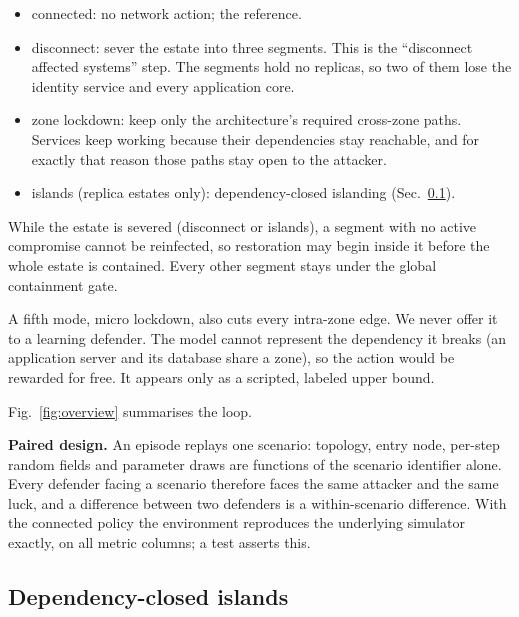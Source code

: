 \documentclass[conference,compsoc]{IEEEtran}
\begin{document}
\begin{itemize}
\item \textsf{connected}: no network action; the reference.
\item \textsf{disconnect}: sever the estate into three segments. This is the
``disconnect affected systems'' step. The segments hold no replicas, so
two of them lose the identity service and every application core.
\item \textsf{zone lockdown}: keep only the architecture's required
cross-zone paths. Services keep working because their dependencies stay
reachable, and for exactly that reason those paths stay open to the
attacker.
\item \textsf{islands} (replica estates only): dependency-closed islanding
(Sec.~\ref{sec:islands}).
\end{itemize}

While the estate is severed (\textsf{disconnect} or \textsf{islands}), a
segment with no active compromise cannot be reinfected, so restoration may
begin inside it before the whole estate is contained. Every other segment
stays under the global containment gate.

A fifth mode, \textsf{micro lockdown}, also cuts every intra-zone edge. We
never offer it to a learning defender. The model cannot represent the
dependency it breaks (an application server and its database share a
zone), so the action would be rewarded for free. It appears only as a
scripted, labeled upper bound.

Fig.~\ref{fig:overview} summarises the loop.

\textbf{Paired design.} An episode replays one scenario: topology, entry
node, per-step random fields and parameter draws are functions of the
scenario identifier alone. Every defender facing a scenario therefore faces
the same attacker and the same luck, and a difference between two
defenders is a within-scenario difference. With the \textsf{connected}
policy the environment reproduces the underlying simulator exactly, on all
metric columns; a test asserts this.

\subsection{Dependency-closed islands}
\label{sec:islands}
\end{document}
